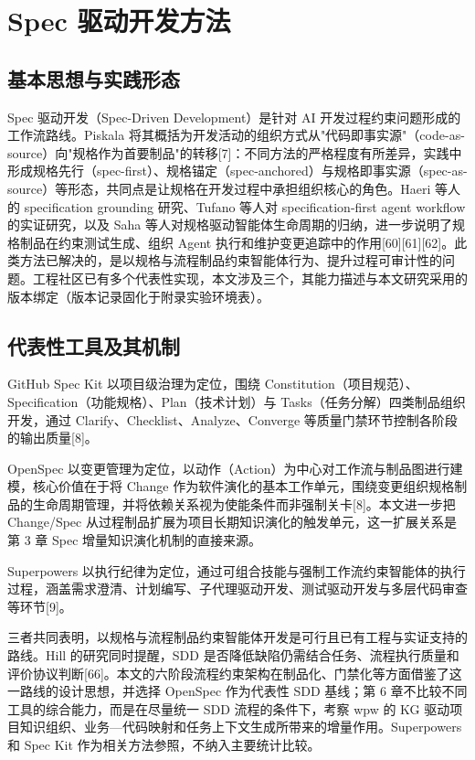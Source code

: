 \section{Spec 驱动开发方法}

\subsection{基本思想与实践形态}
Spec 驱动开发（Spec-Driven Development）是针对 AI 开发过程约束问题形成的工作流路线。Piskala 将其概括为开发活动的组织方式从"代码即事实源"（code-as-source）向"规格作为首要制品"的转移[7]：不同方法的严格程度有所差异，实践中形成规格先行（spec-first）、规格锚定（spec-anchored）与规格即事实源（spec-as-source）等形态，共同点是让规格在开发过程中承担组织核心的角色。Haeri 等人的 specification grounding 研究、Tufano 等人对 specification-first agent workflow 的实证研究，以及 Saha 等人对规格驱动智能体生命周期的归纳，进一步说明了规格制品在约束测试生成、组织 Agent 执行和维护变更追踪中的作用[60][61][62]。此类方法已解决的，是以规格与流程制品约束智能体行为、提升过程可审计性的问题。工程社区已有多个代表性实现，本文涉及三个，其能力描述与本文研究采用的版本绑定（版本记录固化于附录实验环境表）。


\subsection{代表性工具及其机制}
GitHub Spec Kit 以项目级治理为定位，围绕 Constitution（项目规范）、Specification（功能规格）、Plan（技术计划）与 Tasks（任务分解）四类制品组织开发，通过 Clarify、Checklist、Analyze、Converge 等质量门禁环节控制各阶段的输出质量[8]。

OpenSpec 以变更管理为定位，以动作（Action）为中心对工作流与制品图进行建模，核心价值在于将 Change 作为软件演化的基本工作单元，围绕变更组织规格制品的生命周期管理，并将依赖关系视为使能条件而非强制关卡[8]。本文进一步把 Change/Spec 从过程制品扩展为项目长期知识演化的触发单元，这一扩展关系是第 3 章 Spec 增量知识演化机制的直接来源。

Superpowers 以执行纪律为定位，通过可组合技能与强制工作流约束智能体的执行过程，涵盖需求澄清、计划编写、子代理驱动开发、测试驱动开发与多层代码审查等环节[9]。

三者共同表明，以规格与流程制品约束智能体开发是可行且已有工程与实证支持的路线。Hill 的研究同时提醒，SDD 是否降低缺陷仍需结合任务、流程执行质量和评价协议判断[66]。本文的六阶段流程约束架构在制品化、门禁化等方面借鉴了这一路线的设计思想，并选择 OpenSpec 作为代表性 SDD 基线；第 6 章不比较不同工具的综合能力，而是在尽量统一 SDD 流程的条件下，考察 wpw 的 KG 驱动项目知识组织、业务—代码映射和任务上下文生成所带来的增量作用。Superpowers 和 Spec Kit 作为相关方法参照，不纳入主要统计比较。


